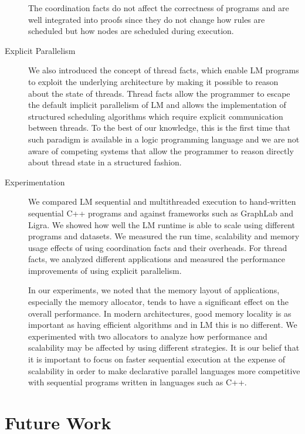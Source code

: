\begin{description}
The coordination facts do not affect the correctness of programs and are well
integrated into proofs since they do not change how rules are scheduled but how
nodes are scheduled during execution.

\item[Explicit Parallelism]

We also introduced the concept of thread facts, which enable LM programs to
exploit the underlying architecture by making it possible to reason about the
state of threads. Thread facts allow the programmer to escape the default
implicit parallelism of LM and allows the implementation of structured
scheduling algorithms which require explicit communication between threads.
To the best of our knowledge, this is the first time that such paradigm
is available in a logic programming language and we are not aware of competing
systems that allow the programmer to reason directly about thread state in a
structured fashion.

\item[Experimentation]

We compared LM sequential and multithreaded execution to hand-written sequential
C++ programs and against frameworks such as GraphLab and Ligra. We showed how
well the LM runtime is able to scale using different programs and datasets. We
measured the run time, scalability and memory usage effects of using
coordination facts and their overheads. For thread facts, we analyzed different
applications and measured the performance improvements of using explicit
parallelism.

In our experiments, we noted that the memory layout of applications, especially
the memory allocator, tends to have a significant effect on the overall
performance. In modern architectures, good memory locality is as important as
having efficient algorithms and in LM this is no different.
We experimented with two allocators to analyze how
performance and scalability may be affected by using different strategies. It is
our belief that it is important to focus on faster sequential execution at the
expense of scalability in order to make declarative parallel languages more
competitive with sequential programs written in languages such as C++.

\end{description}

\section{Future Work}

